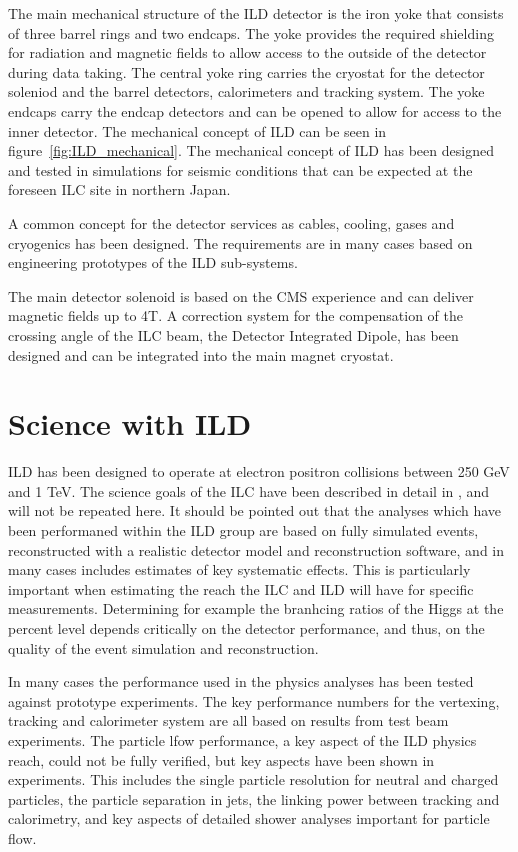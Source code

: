 \documentclass[%
 amsmath,amssymb,
 aps,
]{revtex4-1}
\begin{document}
The main mechanical structure of the ILD detector is the iron yoke that consists of three barrel rings and two endcaps. The yoke provides the required shielding for radiation and magnetic fields to allow access to the outside of the detector during data taking. The central yoke ring carries the cryostat for the detector soleniod and the barrel detectors, calorimeters and tracking system. The yoke endcaps carry the endcap detectors and can be opened to allow for access to the inner detector. The mechanical concept of ILD can be seen in figure~\ref{fig:ILD_mechanical}. The mechanical concept of ILD has been designed and tested in simulations for seismic conditions that can be expected at the foreseen ILC site in northern Japan.

A common concept for the detector services as cables, cooling, gases and cryogenics has been designed. The requirements are in many cases based on engineering prototypes of the ILD sub-systems. 

The main detector solenoid is based on the CMS experience and can deliver magnetic fields up to 4T. A correction system for the compensation of the crossing angle of the ILC beam, the Detector Integrated Dipole, has been designed and can be integrated into the main magnet cryostat.

\section{Science with ILD}
ILD has been designed to operate at electron positron collisions between 250 GeV and 1 TeV. The science goals of the ILC have been described in detail in \cite{ILC-ESU1}, and will not be repeated here. It should be pointed out that the analyses which have been performaned within the ILD group are based on fully simulated events, reconstructed with a realistic detector model and reconstruction software, and in many cases includes estimates of key systematic effects. This is particularly important when estimating the reach the ILC and ILD will have for specific measurements. Determining for example the branhcing ratios of the Higgs at the percent level depends critically on the detector performance, and thus, on the quality of the event simulation and reconstruction. 

In many cases the performance used in the physics analyses has been tested against prototype experiments. The key performance numbers for the vertexing, tracking and calorimeter system are all based on results from test beam experiments. The particle lfow performance, a key aspect of the ILD physics reach, could not be fully verified, but key aspects have been shown in experiments. This includes the single particle resolution for neutral and charged particles, the particle separation in jets, the linking power between tracking and calorimetry, and key aspects of detailed shower analyses important for particle flow. 
\end{document}
